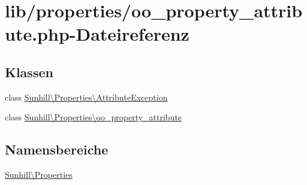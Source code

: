 \hypertarget{oo__property__attribute_8php}{}\section{lib/properties/oo\+\_\+property\+\_\+attribute.php-\/\+Dateireferenz}
\label{oo__property__attribute_8php}
\subsection*{Klassen}
\begin{DoxyCompactItemize}
\item 
class \hyperlink{classSunhill_1_1Properties_1_1AttributeException}{Sunhill\textbackslash{}\+Properties\textbackslash{}\+Attribute\+Exception}
\item 
class \hyperlink{classSunhill_1_1Properties_1_1oo__property__attribute}{Sunhill\textbackslash{}\+Properties\textbackslash{}oo\+\_\+property\+\_\+attribute}
\end{DoxyCompactItemize}
\subsection*{Namensbereiche}
\begin{DoxyCompactItemize}
\item 
 \hyperlink{namespaceSunhill_1_1Properties}{Sunhill\textbackslash{}\+Properties}
\end{DoxyCompactItemize}
